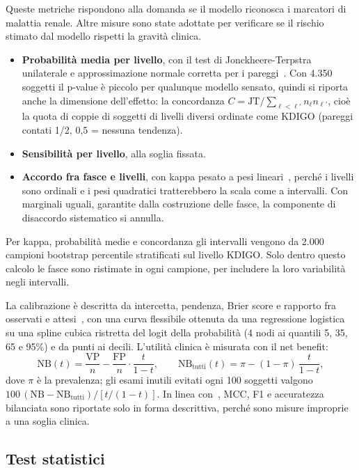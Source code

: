 \documentclass[a4paper, 12pt, oneside]{book}
\begin{document}
Queste metriche rispondono alla domanda se il modello riconosca i marcatori di malattia renale. Altre misure sono state adottate per verificare se il rischio stimato dal modello rispetti la gravità clinica.
\begin{itemize}
	\item \textbf{Probabilità media per livello}, con il test di Jonckheere-Terpstra unilaterale e approssimazione normale corretta per i pareggi~\cite{hollander_nonparametric_2013}. Con 4.350 soggetti il p-value è piccolo per qualunque modello sensato, quindi si riporta anche la dimensione dell'effetto: la concordanza $C = \mathrm{JT} / \sum_{\ell < \ell'} n_\ell n_{\ell'}$, cioè la quota di coppie di soggetti di livelli diversi ordinate come KDIGO (pareggi contati 1/2, 0,5 = nessuna tendenza).
	\item \textbf{Sensibilità per livello}, alla soglia fissata.
	\item \textbf{Accordo fra fasce e livelli}, con kappa pesato a pesi lineari~\cite{cohen_weighted_1968}, perché i livelli sono ordinali e i pesi quadratici tratterebbero la scala come a intervalli. Con marginali uguali, garantite dalla costruzione delle fasce, la componente di disaccordo sistematico si annulla.
\end{itemize}
Per kappa, probabilità medie e concordanza gli intervalli vengono da 2.000 campioni bootstrap percentile stratificati sul livello KDIGO. Solo dentro questo calcolo le fasce sono ristimate in ogni campione, per includere la loro variabilità negli intervalli.

La calibrazione è descritta da intercetta, pendenza, Brier score e rapporto fra osservati e attesi~\cite{van_calster_evaluation_2025}, con una curva flessibile ottenuta da una regressione logistica su una spline cubica ristretta del logit della probabilità (4 nodi ai quantili 5, 35, 65 e 95\%) e da punti ai decili. L'utilità clinica è misurata con il net benefit:
\begin{equation}
	\mathrm{NB}(t) = \frac{\mathrm{VP}}{n} - \frac{\mathrm{FP}}{n}\cdot\frac{t}{1-t}, \qquad \mathrm{NB}_{\text{tutti}}(t) = \pi - (1-\pi)\,\frac{t}{1-t},
\end{equation}
dove $\pi$ è la prevalenza; gli esami inutili evitati ogni 100 soggetti valgono $100\,(\mathrm{NB} - \mathrm{NB}_{\text{tutti}}) / [t/(1-t)]$. In linea con~\cite{van_calster_evaluation_2025}, MCC, F1 e accuratezza bilanciata sono riportate solo in forma descrittiva, perché sono misure improprie a una soglia clinica.

\subsection{Test statistici}
\end{document}
